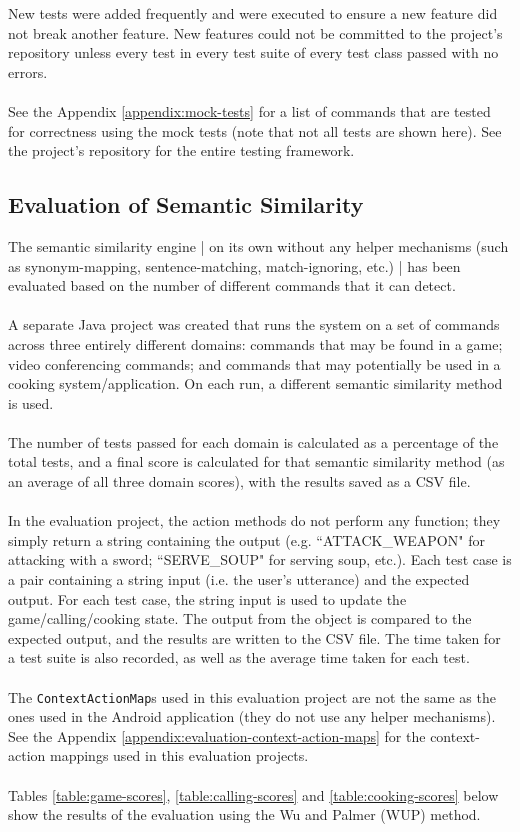 \documentclass[11pt]{article}
\begin{document}
New tests were added frequently and were executed to ensure a new feature did not break another feature. New features could not be committed to the project's repository unless every test in every test suite of every test class passed with no errors.
\\
\\
See the Appendix \ref{appendix:mock-tests} for a list of commands that are tested for correctness using the mock tests (note that not all tests are shown here). See the project's repository for the entire testing framework.

\subsection{Evaluation of Semantic Similarity}
\label{section:eval-similarity}

The semantic similarity engine | on its own without any helper mechanisms (such as synonym-mapping, sentence-matching, match-ignoring, etc.) | has been evaluated based on the number of different commands that it can detect.
\\
\\
A separate Java project was created that runs the system on a set of commands across three entirely different domains: commands that may be found in a game; video conferencing commands; and commands that may potentially be used in a cooking system/application. On each run, a different semantic similarity method is used.
\\
\\
The number of tests passed for each domain is calculated as a percentage of the total tests, and a final score is calculated for that semantic similarity method (as an average of all three domain scores), with the results saved as a CSV file.
\\
\\
In the evaluation project, the action methods do not perform any function; they simply return a string containing the output (e.g. ``ATTACK\_WEAPON" for attacking with a  sword; ``SERVE\_SOUP" for serving soup, etc.). Each test case is a pair containing a string input (i.e. the user's utterance) and the expected output. For each test case, the string input is used to update the game/calling/cooking state. The output from the object is compared to the expected output, and the results are written to the CSV file. The time taken for a test suite is also recorded, as well as the average time taken for each test.
\\
\\
The \texttt{ContextActionMap}s used in this evaluation project are not the same as the ones used in the Android application (they do not use any helper mechanisms). See the Appendix \ref{appendix:evaluation-context-action-maps} for the context-action mappings used in this evaluation projects.
\\
\\
Tables \ref{table:game-scores}, \ref{table:calling-scores} and \ref{table:cooking-scores} below show the results of the evaluation using the Wu and Palmer (WUP) method.
\end{document}
